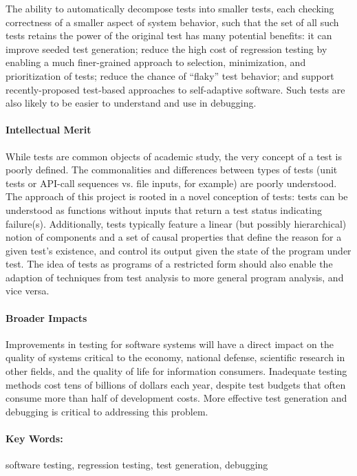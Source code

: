 The ability to automatically decompose tests into smaller tests, each
checking correctness of a smaller aspect of system behavior, such that
the set of all such tests retains the power of the original test has
many potential benefits:  it can improve seeded test generation;
reduce the high cost of regression testing by enabling a much finer-grained
approach to selection, minimization, and prioritization of tests;
reduce the chance of ``flaky'' test behavior; and support
recently-proposed test-based approaches to self-adaptive software.
Such tests are also likely to be easier to understand and
use in debugging.


\paragraph{Intellectual Merit}

While tests are common objects of academic study, the very concept of
a test is poorly defined.  The commonalities and differences between
types of tests (unit tests or API-call sequences vs. file inputs, for
example) are poorly understood.  The approach of this project is
rooted in a novel conception of tests: tests can be understood as
functions without inputs that return a test status indicating
failure(s).  Additionally, tests typically feature a linear (but
possibly hierarchical) notion of components and a set of causal
properties that define the reason for a given test's existence, and
control its output given the state of the program under test.  The
idea of tests as programs of a restricted form should also enable the
adaption of techniques from test analysis to more general program
analysis, and vice versa.

\paragraph{Broader Impacts}

Improvements in testing for software systems will have a direct impact
on the quality of systems critical to the economy, national defense,
scientific research in other fields, and the quality of life for
information consumers.  Inadequate testing methods cost tens of
billions of dollars each year, despite test budgets that often consume
more than half of development costs.  More effective test generation
and debugging is critical to addressing this problem.

\paragraph{Key Words:}
software testing, regression testing, test generation, debugging


